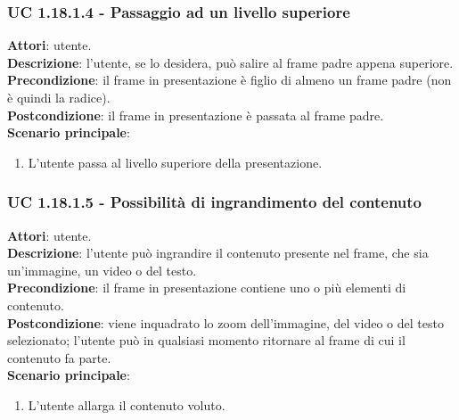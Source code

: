 	\subsubsection{UC 1.18.1.4 - Passaggio ad un livello superiore}{
		\label{uc1.18.1.4}
		\textbf{Attori}: utente. \\
		\textbf{Descrizione}: l'utente, se lo desidera, può salire al frame padre appena superiore. \\
		\textbf{Precondizione}: il frame in presentazione è figlio di almeno un frame padre (non è quindi la radice).	\\
		\textbf{Postcondizione}: il frame in presentazione è passata al frame padre.\\
		\textbf{Scenario principale}:
		\begin{enumerate}
			\item L'utente passa al livello superiore della presentazione.
		\end{enumerate}
	}
	\subsubsection{UC 1.18.1.5 - Possibilità di ingrandimento del contenuto}{
		\label{uc1.18.1.18}
		\textbf{Attori}: utente. \\
		\textbf{Descrizione}: l'utente può ingrandire il contenuto presente nel frame, che sia un'immagine, un video o del testo. \\
		\textbf{Precondizione}: il frame in presentazione contiene uno o più elementi di contenuto.	\\
		\textbf{Postcondizione}: viene inquadrato lo zoom dell'immagine, del video o del testo selezionato; l'utente può in qualsiasi momento ritornare al frame di cui il contenuto fa parte.\\
		\textbf{Scenario principale}:
		\begin{enumerate}
			\item L'utente allarga il contenuto voluto.
		\end{enumerate}
	}

